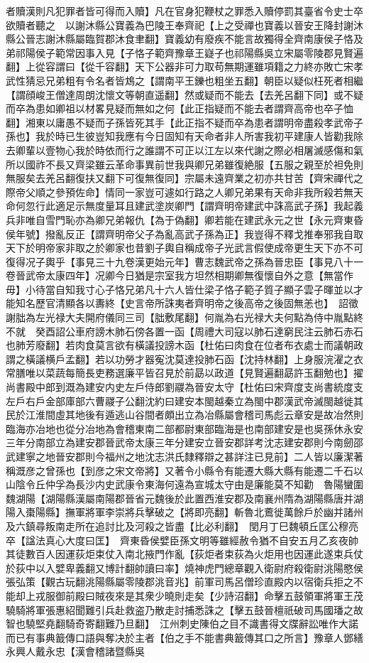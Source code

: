 者贖漢則凡犯罪者皆可得而入贖】凡在官身犯鞭杖之罪悉入贖停罰其臺省令史士卒欲贖者聽之　以謝沐縣公寶義為巴陵王奉齊祀【上之受禪也寶義以晉安王降封謝沐縣公晉志謝沐縣屬臨賀郡沐食聿翻】寶義幼有廢疾不能言故獨得全齊南康侯子恪及弟祁陽侯子範常因事入見【子恪子範齊豫章王嶷子也祁陽縣吳立宋屬零陵郡見賢遍翻】上從容謂曰【從千容翻】天下公器非可力取苟無期運雖項籍之力終亦敗亡宋孝武性猜忌兄弟粗有令名者皆鴆之【謂南平王鑠也粗坐五翻】朝臣以疑似枉死者相繼【謂顔峻王僧達周朗沈懷文等朝直遥翻】然或疑而不能去【去羌呂翻下同】或不疑而卒為患如卿祖以材畧見疑而無如之何【此正指疑而不能去者謂齊高帝也卒子恤翻】湘東以庸愚不疑而子孫皆死其手【此正指不疑而卒為患者謂明帝盡殺孝武帝子孫也】我於時已生彼豈知我應有今日固知有天命者非人所害我初平建康人皆勸我除去卿輩以壹物心我於時依而行之誰謂不可正以江左以來代謝之際必相屠滅感傷和氣所以國祚不長又齊梁雖云革命事異前世我與卿兄弟雖復絶服【五服之親至於袒免則無服矣去羌呂翻復扶又翻下可復無復同】宗屬未遠齊業之初亦共甘苦【齊宋禪代之際帝父順之參預佐命】情同一家豈可遽如行路之人卿兄弟果有天命非我所殺若無天命何忽行此適足示無度量耳且建武塗炭卿門【謂齊明帝建武中誅高武子孫】我起義兵非唯自雪門恥亦為卿兄弟報仇【為于偽翻】卿若能在建武永元之世【永元齊東昏侯年號】撥亂反正【謂齊明帝父子為亂高武子孫為正】我豈得不釋戈推奉邪我自取天下於明帝家非取之於卿家也昔劉子輿自稱成帝子光武言假使成帝更生天下亦不可復得况子輿乎【事見三十九卷漢更始元年】曹志魏武帝之孫為晉忠臣【事見八十一卷晉武帝太康四年】况卿今日猶是宗室我方坦然相期卿無復懷自外之意【無當作毋】小待當自知我寸心子恪兄弟凡十六人皆仕梁子恪子範子質子顯子雲子暉並以才能知名歷官清顯各以夀終【史言帝所誅夷者齊明帝之後高帝之後固無恙也】　詔徵謝朏為左光禄大夫開府儀同三司【朏敷尾翻】何胤為右光禄大夫何點為侍中胤點終不就　癸酉詔公車府謗木肺石傍各置一函【周禮大司寇以肺石達窮民注云肺石赤石也肺芳廢翻】若肉食莫言欲有橫議投謗木函【杜佑曰肉食在位者布衣處士而議朝政謂之橫議横戶孟翻】若以功勞才器寃沈莫達投肺石函【沈持林翻】上身服浣濯之衣常膳唯以菜蔬每簡長吏務選廉平皆召見於前勗以政道【見賢遍翻勗許玉翻勉也】擢尚書殿中郎到溉為建安内史左戶侍郎劉鬷為晉安太守【杜佑曰宋齊度支尚書統度支左戶右戶金部庫部六曹鬷子公翻沈約曰建安本閩越秦立為閩中郡漢武帝滅閩越徙其民於江淮間虛其地後有遁逃山谷間者頗出立為冶縣屬會稽司馬彪云章安是故冶然則臨海亦冶地也從分冶地為會稽東南二部都尉東部臨海是也南部建安是也吳孫休永安三年分南部立為建安郡晉武帝太康三年分建安立晉安郡詳考沈志建安郡則今南劒邵武建寧之地晉安郡則今福州之地沈志洪氏隸釋辯之甚詳注已見前】二人皆以廉潔著稱溉彦之曾孫也【到彦之宋文帝將】又著令小縣令有能遷大縣大縣有能遷二千石以山陰令丘仲孚為長沙内史武康令東海何遠為宣城太守由是廉能莫不知勸　魯陽蠻圍魏湖陽【湖陽縣漢屬南陽郡晉省元魏後於此置西淮安郡及南襄州隋為湖陽縣唐并湖陽入棗陽縣】撫軍將軍李崇將兵擊破之【將即亮翻】斬魯北鷰徙萬餘戶於幽并諸州及六鎮尋叛南走所在追討比及河殺之皆盡【比必利翻】　閏月丁巳魏頓丘匡公穆亮卒【諡法真心大度曰匡】　齊東昏侯嬖臣孫文明等雖經赦令猶不自安五月乙亥夜帥其徒數百人因運荻炬束仗入南北掖門作亂【荻炬者束荻為火炬用也因運此遂束兵仗於荻中以入嬖卑義翻又博計翻帥讀曰率】燒神虎門總章觀入衛尉府殺衛尉洮陽愍侯張弘策【觀古玩翻洮陽縣屬零陵郡洮音兆】前軍司馬呂僧珍直殿内以宿衛兵拒之不能却上戎服御前殿曰賊夜來是其衆少曉則走矣【少詩沼翻】命擊五鼓領軍將軍王茂驍騎將軍張惠紹聞難引兵赴救盗乃散走討捕悉誅之【擊五鼓晉檀祇破司馬國璠之故智也驍堅堯翻騎奇寄翻難乃旦翻】　江州刺史陳伯之目不識書得文牒辭訟唯作大諾而已有事典籖傳口語與奪决於主者【伯之手不能書典籖傳其口之所言】豫章人鄧繕永興人戴永忠【漢會稽諸暨縣吳